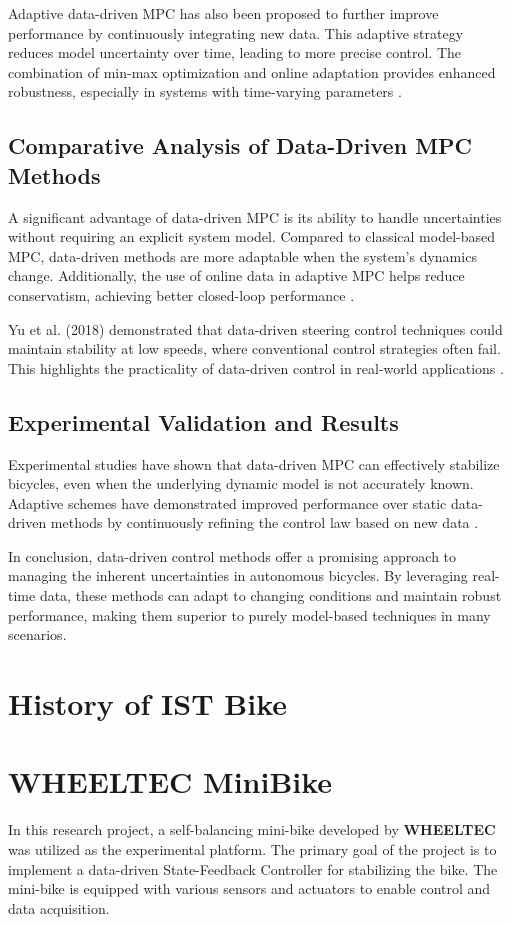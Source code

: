 	Adaptive data-driven MPC has also been proposed to further improve performance by continuously integrating new data. This adaptive strategy reduces model uncertainty over time, leading to more precise control. The combination of min-max optimization and online adaptation provides enhanced robustness, especially in systems with time-varying parameters \cite{xie2024}.
	
	\subsection{Comparative Analysis of Data-Driven MPC Methods}
	A significant advantage of data-driven MPC is its ability to handle uncertainties without requiring an explicit system model. Compared to classical model-based MPC, data-driven methods are more adaptable when the system's dynamics change. Additionally, the use of online data in adaptive MPC helps reduce conservatism, achieving better closed-loop performance \cite{xie2024}.
	
	Yu et al. (2018) demonstrated that data-driven steering control techniques could maintain stability at low speeds, where conventional control strategies often fail. This highlights the practicality of data-driven control in real-world applications \cite{yu2018}.
	
	\subsection{Experimental Validation and Results}
	Experimental studies have shown that data-driven MPC can effectively stabilize bicycles, even when the underlying dynamic model is not accurately known. Adaptive schemes have demonstrated improved performance over static data-driven methods by continuously refining the control law based on new data \cite{xie2024}.
	
	In conclusion, data-driven control methods offer a promising approach to managing the inherent uncertainties in autonomous bicycles. By leveraging real-time data, these methods can adapt to changing conditions and maintain robust performance, making them superior to purely model-based techniques in many scenarios.


\section{History of IST Bike}

\section{WHEELTEC MiniBike}
In this research project, a self-balancing mini-bike developed by \textbf{WHEELTEC} was utilized as the experimental platform. The primary goal of the project is to implement a data-driven State-Feedback Controller for stabilizing the bike. The mini-bike is equipped with various sensors and actuators to enable control and data acquisition.

